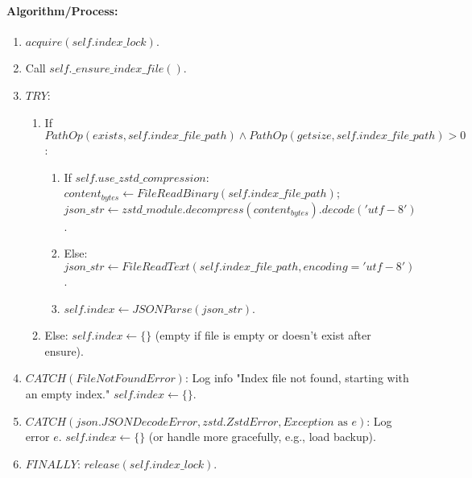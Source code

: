 \documentclass{article}
\begin{document}
\paragraph{Algorithm/Process:}
\begin{enumerate}
    \item $acquire(self.index\_lock)$.
    \item Call $self.\_ensure\_index\_file()$.
    \item $TRY$:
        \begin{enumerate}
            \item If $PathOp(exists, self.index\_file\_path) \land PathOp(getsize, self.index\_file\_path) > 0$:
                \begin{enumerate}
                    \item If $self.use\_zstd\_compression$:
                        $content_{bytes} \leftarrow FileReadBinary(self.index\_file\_path)$;
                        $json\_str \leftarrow zstd\_module.decompress(content_{bytes}).decode('utf-8')$.
                    \item Else:
                        $json\_str \leftarrow FileReadText(self.index\_file\_path, encoding='utf-8')$.
                    \item $self.index \leftarrow JSONParse(json\_str)$.
                \end{enumerate}
            \item Else: $self.index \leftarrow \{\}$ (empty if file is empty or doesn't exist after ensure).
        \end{enumerate}
    \item $CATCH (FileNotFoundError)$: Log info "Index file not found, starting with an empty index." $self.index \leftarrow \{\}$.
    \item $CATCH (json.JSONDecodeError, zstd.ZstdError, Exception \text{ as } e)$: Log error $e$. $self.index \leftarrow \{\}$ (or handle more gracefully, e.g., load backup).
    \item $FINALLY$: $release(self.index\_lock)$.
\end{enumerate}
\end{document}
